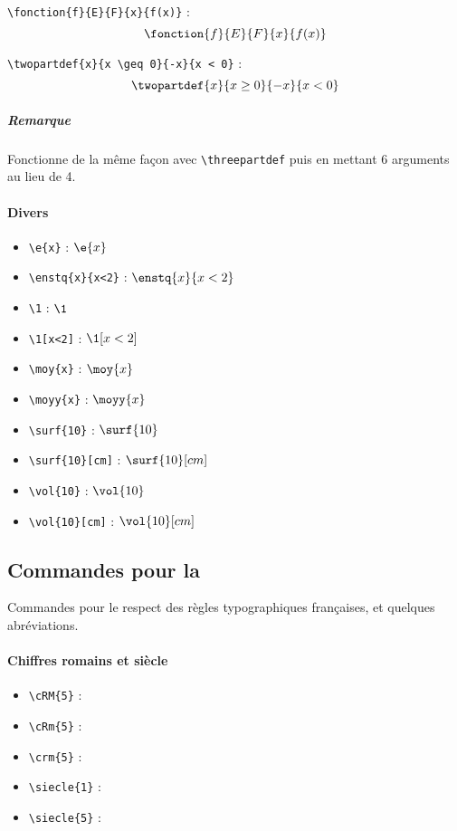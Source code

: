 \verb=\fonction{f}{E}{F}{x}{f(x)}= : $$\fonction{f}{E}{F}{x}{f(x)}$$

\verb=\twopartdef{x}{x \geq 0}{-x}{x < 0}= : $$ \twopartdef { x } {x \geq 0} {-x} {x < 0}$$

\subparagraph{Remarque} Fonctionne de la même façon avec \verb=\threepartdef= puis en mettant 6 arguments au lieu de 4.

\paragraph{Divers}
\begin{itemize}
    \item \verb=\e{x}= : $\e{x}$
    \item \verb=\enstq{x}{x<2}= : $\enstq{x}{x<2}$
    \item \verb=\1= : $\1$
    \item \verb=\1[x<2]= : $\1[x<2]$
    \item \verb=\moy{x}= : $\moy{x}$
    \item \verb=\moyy{x}= : $\moyy{x}$
    \item \verb=\surf{10}= : $\surf{10}$
    \item \verb=\surf{10}[cm]= : $\surf{10}[cm]$
    \item \verb=\vol{10}= : $\vol{10}$
    \item \verb=\vol{10}[cm]= : $\vol{10}[cm]$
\end{itemize}


\subsection*{Commandes pour la }

Commandes pour le respect des règles typographiques françaises, et quelques abréviations.

\paragraph{Chiffres romains et siècle}
\begin{itemize}
    \item \verb=\cRM{5}= : 
    \item \verb=\cRm{5}= : 
    \item \verb=\crm{5}= : 
    \item \verb=\siecle{1}= : 
    \item \verb=\siecle{5}= : 
\end{itemize}

